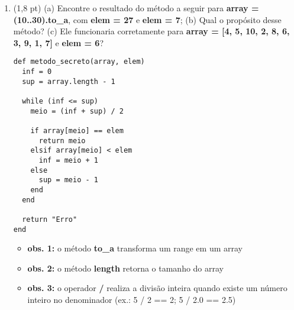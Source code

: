 \documentclass[a4paper,10pt]{article}
\begin{document}
\begin{multicols*}{2}
\begin{enumerate}
  \item (1,8 pt) (a) Encontre o resultado do método a seguir para \textbf{array = (10..30).to\_a}, com \textbf{elem = 27} e \textbf{elem = 7}; (b) Qual o propósito desse método? (c) Ele funcionaria corretamente para \textbf{array = [4, 5, 10, 2, 8, 6, 3, 9, 1, 7]} e \textbf{elem = 6}?

  \begin{verbatim}
def metodo_secreto(array, elem)
  inf = 0
  sup = array.length - 1

  while (inf <= sup)
    meio = (inf + sup) / 2

    if array[meio] == elem
      return meio
    elsif array[meio] < elem
      inf = meio + 1
    else
      sup = meio - 1
    end
  end

  return "Erro"
end
  \end{verbatim}
  \begin{itemize}[itemsep=0pt]
    \item [] \textbf{obs. 1:} o método \textbf{to\_a} transforma um range em um array
    \item [] \textbf{obs. 2:} o método \textbf{length} retorna o tamanho do array
    \item [] \textbf{obs. 3:} o operador \textbf{/} realiza a divisão inteira quando existe um número inteiro no denominador (ex.: 5 / 2 == 2; 5 / 2.0 == 2.5)
  \end{itemize}
\end{enumerate}
\end{multicols*}
\end{document}
